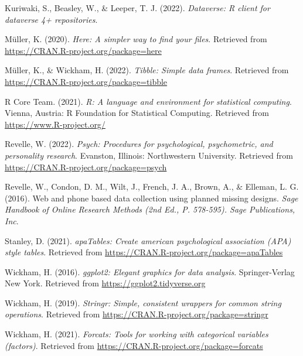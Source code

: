 \documentclass[
  english,
  man]{apa6}
\newlength{\cslhangindent}
\newlength{\cslentryspacingunit} %
\newenvironment{CSLReferences}[2] %
 {%
  \setlength{\parindent}{0pt}
  \ifodd #1
  \let\oldpar\par
  \def\par{\hangindent=\cslhangindent\oldpar}
  \fi
  \setlength{\parskip}{#2\cslentryspacingunit}
 }%
 {}
\begin{document}
\begin{CSLReferences}{1}{0}
\leavevmode{}%
Kuriwaki, S., Beasley, W., \& Leeper, T. J. (2022). \emph{Dataverse: R client for dataverse 4+ repositories}.

\leavevmode{}%
Müller, K. (2020). \emph{Here: A simpler way to find your files}. Retrieved from \url{https://CRAN.R-project.org/package=here}

\leavevmode{}%
Müller, K., \& Wickham, H. (2022). \emph{Tibble: Simple data frames}. Retrieved from \url{https://CRAN.R-project.org/package=tibble}

\leavevmode{}%
R Core Team. (2021). \emph{R: A language and environment for statistical computing}. Vienna, Austria: R Foundation for Statistical Computing. Retrieved from \url{https://www.R-project.org/}

\leavevmode{}%
Revelle, W. (2022). \emph{Psych: Procedures for psychological, psychometric, and personality research}. Evanston, Illinois: Northwestern University. Retrieved from \url{https://CRAN.R-project.org/package=psych}

\leavevmode{}%
Revelle, W., Condon, D. M., Wilt, J., French, J. A., Brown, A., \& Elleman, L. G. (2016). Web and phone based data collection using planned missing designs. \emph{Sage Handbook of Online Research Methods (2nd Ed., P. 578-595). Sage Publications, Inc}.

\leavevmode{}%
Stanley, D. (2021). \emph{apaTables: Create american psychological association (APA) style tables}. Retrieved from \url{https://CRAN.R-project.org/package=apaTables}

\leavevmode{}%
Wickham, H. (2016). \emph{ggplot2: Elegant graphics for data analysis}. Springer-Verlag New York. Retrieved from \url{https://ggplot2.tidyverse.org}

\leavevmode{}%
Wickham, H. (2019). \emph{Stringr: Simple, consistent wrappers for common string operations}. Retrieved from \url{https://CRAN.R-project.org/package=stringr}

\leavevmode{}%
Wickham, H. (2021). \emph{Forcats: Tools for working with categorical variables (factors)}. Retrieved from \url{https://CRAN.R-project.org/package=forcats}


\end{CSLReferences}
\end{document}

